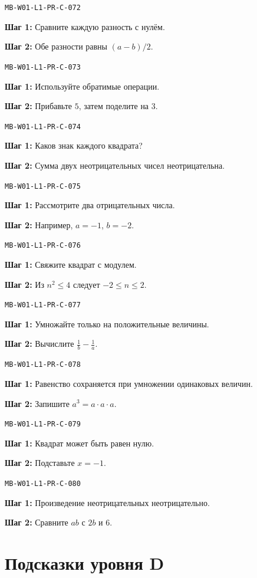 \documentclass[11pt,a4paper,openany]{book}
\newcommand{\muid}[1]{\texttt{\footnotesize #1}}
\begin{document}
\noindent\muid{MB-W01-L1-PR-C-072}\par 
\textbf{Шаг 1:} Сравните каждую разность с нулём.\par \textbf{Шаг 2:} Обе разности равны $(a-b)/2$.\smallskip

\noindent\muid{MB-W01-L1-PR-C-073}\par 
\textbf{Шаг 1:} Используйте обратимые операции.\par \textbf{Шаг 2:} Прибавьте $5$, затем поделите на $3$.\smallskip

\noindent\muid{MB-W01-L1-PR-C-074}\par 
\textbf{Шаг 1:} Каков знак каждого квадрата?\par \textbf{Шаг 2:} Сумма двух неотрицательных чисел неотрицательна.\smallskip

\noindent\muid{MB-W01-L1-PR-C-075}\par 
\textbf{Шаг 1:} Рассмотрите два отрицательных числа.\par \textbf{Шаг 2:} Например, $a=-1$, $b=-2$.\smallskip

\noindent\muid{MB-W01-L1-PR-C-076}\par 
\textbf{Шаг 1:} Свяжите квадрат с модулем.\par \textbf{Шаг 2:} Из $n^2\le4$ следует $-2\le n\le2$.\smallskip

\noindent\muid{MB-W01-L1-PR-C-077}\par 
\textbf{Шаг 1:} Умножайте только на положительные величины.\par \textbf{Шаг 2:} Вычислите $\frac1b-\frac1a$.\smallskip

\noindent\muid{MB-W01-L1-PR-C-078}\par 
\textbf{Шаг 1:} Равенство сохраняется при умножении одинаковых величин.\par \textbf{Шаг 2:} Запишите $a^3=a\cdot a\cdot a$.\smallskip

\noindent\muid{MB-W01-L1-PR-C-079}\par 
\textbf{Шаг 1:} Квадрат может быть равен нулю.\par \textbf{Шаг 2:} Подставьте $x=-1$.\smallskip

\noindent\muid{MB-W01-L1-PR-C-080}\par 
\textbf{Шаг 1:} Произведение неотрицательных неотрицательно.\par \textbf{Шаг 2:} Сравните $ab$ с $2b$ и $6$.\smallskip

\section{Подсказки уровня D}
\end{document}
